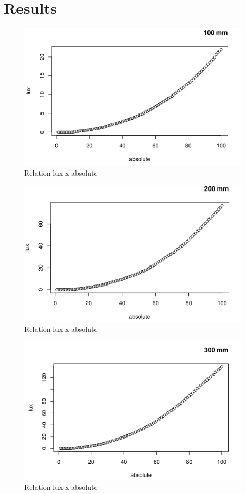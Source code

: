 \documentclass[11pt]{article}
\begin{document}
\section{Results}
\label{sec-3}
\begin{figure}[htb]
\centering
\includegraphics[width=.9\linewidth]{./m100.png}
\caption{\label{Measurements-of-differents-sizes}Relation lux x absolute}
\end{figure}
\begin{figure}[htb]
\centering
\includegraphics[width=.9\linewidth]{./m200.png}
\caption{\label{Measurements-of-differents-sizes}Relation lux x absolute}
\end{figure}
\begin{figure}[htb]
\centering
\includegraphics[width=.9\linewidth]{./m300.png}
\caption{\label{Measurements-of-differents-sizes}Relation lux x absolute}
\end{figure}
\end{document}
